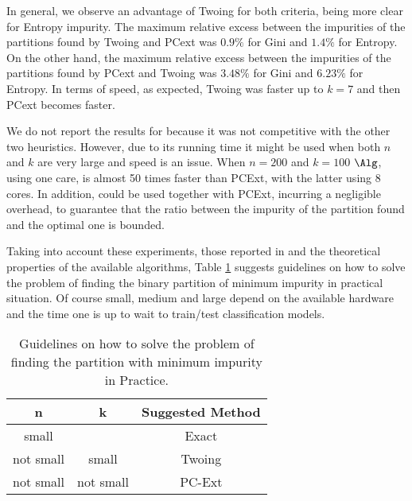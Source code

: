 In general, we observe an advantage of Twoing  
for both criteria, being more clear for Entropy impurity.
The maximum relative excess  between the impurities 
of the partitions found by  Twoing and PCext was $0.9\%$ for
Gini and $1.4 \%$ for Entropy.
On the other hand, the  maximum relative excess  between the impurities 
of the partitions found by  PCext and Twoing was $3.48 \%$ for
Gini and $6.23 \%$ for Entropy. 
In terms of speed, as expected, Twoing was faster up to $k=7$ and then 
PCext becomes faster.



We do not report the results for \Alg because it was not competitive with the other
two heuristics. However, due to its running time it might be used when both $n$ and $k$ are very large and
speed is an  issue. When $n=200$ and $k=100$ $\Alg$, using one care, is almost 50 times
faster than PCExt, with the latter using  8 cores. In addition,
\Alg could be  used together with  PCExt, incurring a negligible overhead, to guarantee that the ratio 
between the impurity of the partition found and the optimal one is bounded.

 
Taking into account these  experiments, those reported in \cite{journals/datamine/CoppersmithHH99}
and the  theoretical properties of the available algorithms, 
Table  \ref{tab:guidelines}  suggests  guidelines on how to solve the 
problem of finding the binary partition of minimum impurity  in practical situation.
Of course small, medium and large depend on the available
hardware and the time one  is up to wait to train/test classification models. 


\begin{table}[htb]
\centering
\caption{Guidelines on how to solve the problem of finding the partition with minimum impurity 
in Practice.}
\label{tab:guidelines}
\begin{tabular}{c|c|c}
{\bf n} & {\bf k} & {\bf Suggested Method} \\ \hline 
small &  &  Exact \\
not small  & small & Twoing \\
not small  & not small & PC-Ext \\
\end{tabular}
\end{table}




